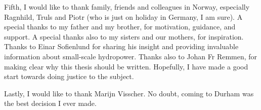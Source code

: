 \begin{quoting}
Fifth, I would like to thank family, friends and colleagues in Norway, especially Ragnhild, Truls and Piotr (who is just on holiday in Germany, I am sure). A special thanks to my father and my brother, for motivation, guidance, and support. A special thanks also to my sisters and our mothers, for inspiration. Thanks to Einar Sofienlund for sharing his insight and providing invaluable information about small-scale hydropower. Thanks also to Johan Fr Remmen, for making clear why this thesis should be written. Hopefully, I have made a good start towards doing justice to the subject.

Lastly, I would like to thank Marijn Visscher. No doubt, coming to Durham was the best decision I ever made.

\end{quoting}






